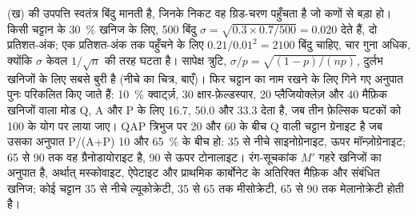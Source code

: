 (ख) की उपपत्ति स्वतंत्र बिंदु मानती है, जिनके निकट वह ग्रिड-चरण पहुँचता है जो कणों से बड़ा
हो। किसी चट्टान के \qty{30}{\percent} खनिज के लिए, 500 बिंदु $\sigma =
\sqrt{0.3 \times 0.7/500} = 0.020$ देते हैं, दो प्रतिशत-अंक; एक प्रतिशत-अंक तक पहुँचने के लिए
$0.21/0.01^2 = 2100$ बिंदु चाहिए, चार गुना अधिक, क्योंकि $\sigma$ केवल $1/\sqrt n$ की तरह घटता है।
सापेक्ष त्रुटि, $\sigma/p = \sqrt{(1-p)/(np)}$, दुर्लभ खनिजों के लिए सबसे बुरी है (नीचे का चित्र,
बाएँ)। फिर चट्टान का नाम रखने के लिए गिने गए अनुपात पुनः परिकलित किए जाते हैं:
\qty{10}{\percent} क्वार्ट्ज़, 30 क्षार-फ़ेल्डस्पार, 20 प्लैजियोक्लेज़ और 40 मैफ़िक खनिजों वाला मोड Q, A और
P के लिए 16.7, 50.0 और 33.3 देता है, जब तीन फ़ेल्सिक घटकों को 100 के योग पर लाया जाए। QAP
त्रिभुज पर 20 और 60 के बीच Q वाली चट्टान ग्रेनाइट है जब उसका अनुपात P/(A+P) 10 और
\qty{65}{\percent} के बीच हो: 35 से नीचे साइनोग्रेनाइट, ऊपर मॉन्ज़ोग्रेनाइट; 65 से 90 तक वह
ग्रैनोडायोराइट है, 90 से ऊपर टोनालाइट। रंग-सूचकांक $M'$ गहरे खनिजों का अनुपात है, अर्थात्
मस्कोवाइट, ऐपेटाइट और प्राथमिक कार्बोनेट के अतिरिक्त मैफ़िक और संबंधित खनिज; कोई चट्टान
35 से नीचे ल्यूकोक्रेटी, 35 से 65 तक मीसोक्रेटी, 65 से 90 तक मेलानोक्रेटी होती है।

